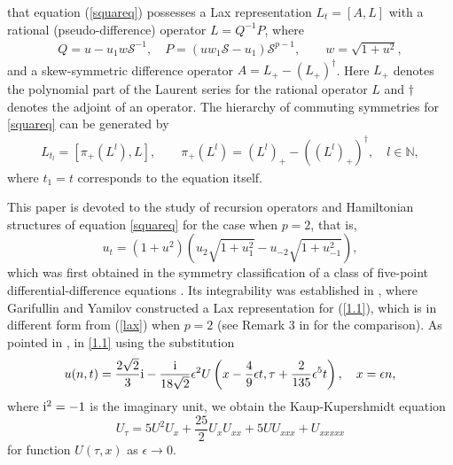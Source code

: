 \documentclass{article}
\numberwithin{equation}{section}
\newcommand\cS{{\mathcal S}}
\newcommand{\field}[1]{\mathbb{#1}}
\newcommand{\N}{\field{N}}
\begin{document}
that
equation (\ref{squareq})
possesses a Lax representation  $L_t=[A, L]$ with a rational (pseudo-difference) 
operator $L=Q^{-1}P$, where
\begin{eqnarray}\label{lax}
 Q=u - u_1 w \cS^{-1}, \quad P=(u w_1 \cS-u_1) \cS^{p-1},\qquad  w=\sqrt{1+u^2},
\end{eqnarray}
and a skew-symmetric difference operator $A=L_{+}-(L_{+})^{\dagger}$. Here $L_+$ 
denotes the polynomial part of the Laurent series
for the rational operator $L$ and $\dagger$ denotes the adjoint of an operator. The
hierarchy of commuting symmetries for \eqref{squareq} can be generated by
\begin{eqnarray}\label{symp}
 L_{t_l}=[\pi_{+}(L^l), L], \qquad
\pi_{+}(L^l)=\left(L^l\right)_{+}-\left(\left(L^l\right)_{+}\right)^{\dagger},\quad l\in \N,
\end{eqnarray}
where $t_1=t$ corresponds to the equation itself.



This paper is devoted to the study of recursion operators and Hamiltonian 
structures of equation \eqref{squareq} for the case when $p=2$, that is,
	\begin{equation}
		u_t =(1+u^2) (u_{2} 
\sqrt{1+u_{1}^2}-u_{-2}\sqrt{1+u_{-1}^2}),
		\label{1.1}
	\end{equation}
which was first obtained in the symmetry classification of a class
of five-point differential-difference equations \cite{49}. Its integrability
was established
in \cite{50}, where Garifullin and Yamilov constructed a Lax representation for 
(\ref{1.1}), which is in different form from (\ref{lax}) when $p=2$ (see Remark 
3 in \cite{15} for the comparison).
As pointed in \cite{50}, in \eqref{1.1} using the substitution
\begin{equation*}
		u(n, t) = \frac{2\sqrt{2}}{3} {\rm{i}} - \frac{\rm{i}}{18 
\sqrt{2}} \epsilon^2 U\left(x - \frac{4}{9} \epsilon t, \tau 
+\frac{2}{135}\epsilon^5 t \right), \quad x=\epsilon n,
		\label{ContLim}
	\end{equation*}
where ${\rm i}^2=-1$ is the imaginary unit, we obtain the Kaup-Kupershmidt 
equation
	\begin{equation*}
		U_\tau = 5 U^2 U_x + \frac{25}{2}  U_x U_{xx} + 5 U U_{xxx} + 
U_{xxxxx}\label{KK}
	\end{equation*}
	for function $U(\tau, x)$ as $\epsilon\rightarrow 0$.
\end{document}
